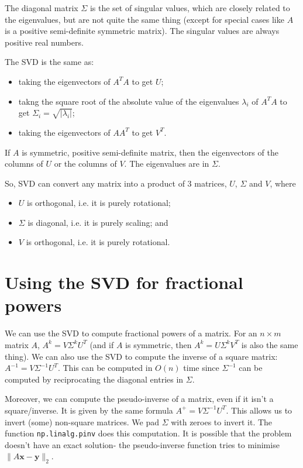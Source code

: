 \documentclass[a4paper, openany]{memoir}
\begin{document}
    The diagonal matrix $\Sigma$ is the set of singular values, which are closely related to the eigenvalues, but are not quite the same thing (except for special cases like $A$ is a positive semi-definite symmetric matrix). The singular values are always positive real numbers.

    The SVD is the same as:
    \begin{itemize}
        \item taking the eigenvectors of $A^T A$ to get $U$;
        \item takng the square root of the absolute value of the eigenvalues $\lambda_i$ of $A^T A$ to get $\Sigma_i = \sqrt{|\lambda_i|}$;
        \item taking the eigenvectors of $AA^T$ to get $V^T$.
    \end{itemize}
    If $A$ is symmetric, positive semi-definite matrix, then the eigenvectors of the columns of $U$ or the columns of $V$. The eigenvalues are in $\Sigma$.

    So, SVD can convert any matrix into a product of 3 matrices, $U$, $\Sigma$ and $V$, where
    \begin{itemize}
        \item $U$ is orthogonal, i.e. it is purely rotational;
        \item $\Sigma$ is diagonal, i.e. it is purely scaling; and
        \item $V$ is orthogonal, i.e. it is purely rotational.
    \end{itemize}

    \section{Using the SVD for fractional powers}
    We can use the SVD to compute fractional powers of a matrix. For an $n \times m$ matrix $A$, $A^k = V \Sigma^k U^T$ (and if $A$ is symmetric, then $A^k = U \Sigma^k V^T$ is also the same thing). We can also use the SVD to compute the inverse of a square matrix: $A^{-1} = V \Sigma^{-1} U^T$. This can be computed in $O(n)$ time since $\Sigma^{-1}$ can be computed by reciprocating the diagonal entries in $\Sigma$.

    Moreover, we can compute the pseudo-inverse of a matrix, even if it isn't a square/inverse. It is given by the same formula $A^{+} = V \Sigma^{-1} U^T$. This allows us to invert (some) non-square matrices. We pad $\Sigma$ with zeroes to invert it. The function \texttt{np.linalg.pinv} does this computation. It is possible that the problem doesn't have an exact solution- the pseudo-inverse function tries to minimise $\lVert A \mathbf{x} - \mathbf{y} \rVert_2$.
\end{document}
